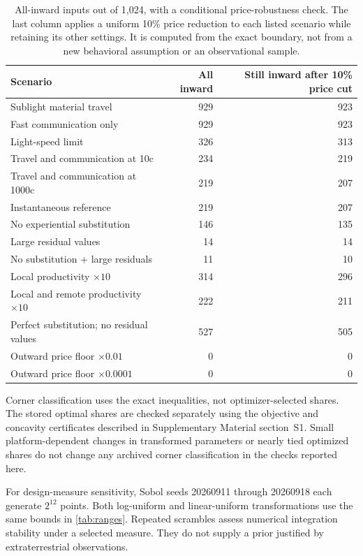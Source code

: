 \documentclass[11pt,a4paper]{article}
\theoremstyle{definition}\newtheorem{definition}{Definition}
\begin{document}
\begin{table}[htbp]
\centering\small
\caption{All-inward inputs out of 1,024, with a conditional price-robustness check. The last column applies a uniform 10\% price reduction to each listed scenario while retaining its other settings. It is computed from the exact boundary, not from a new behavioral assumption or an observational sample.}
\label{tab:scenarios}

\begin{tabularx}{\textwidth}{@{}Xrr@{}}
\toprule
Scenario & All inward & Still inward after 10\% price cut \\
\midrule
Sublight material travel & 929 & 923 \\
Fast communication only & 929 & 923 \\
Light-speed limit & 326 & 313 \\
Travel and communication at 10c & 234 & 219 \\
Travel and communication at 1000c & 219 & 207 \\
Instantaneous reference & 219 & 207 \\
No experiential substitution & 146 & 135 \\
Large residual values & 14 & 14 \\
No substitution + large residuals & 11 & 10 \\
Local productivity $\times10$ & 314 & 296 \\
Local and remote productivity $\times10$ & 222 & 211 \\
Perfect substitution; no residual values & 527 & 505 \\
Outward price floor $\times0.01$ & 0 & 0 \\
Outward price floor $\times0.0001$ & 0 & 0 \\
\bottomrule
\end{tabularx}


\end{table}

Corner classification uses the exact inequalities, not optimizer-selected shares. The stored optimal shares are checked separately using the objective and concavity certificates described in Supplementary Material section~S1. Small platform-dependent changes in transformed parameters or nearly tied optimized shares do not change any archived corner classification in the checks reported here.

For design-measure sensitivity, Sobol seeds 20260911 through 20260918 each generate $2^{12}$ points. Both log-uniform and linear-uniform transformations use the same bounds in \cref{tab:ranges}. Repeated scrambles assess numerical integration stability under a selected measure. They do not supply a prior justified by extraterrestrial observations.
\end{document}
